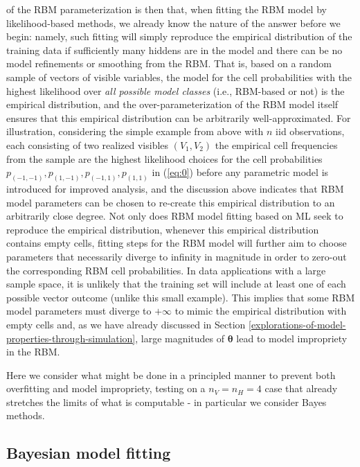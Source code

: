 \documentclass[12pt]{article}
\theoremstyle{definition}
\newcommand{\nv}{{n_{\scriptscriptstyle V}}}
\newcommand{\nh}{{n_{\scriptscriptstyle H}}}
\begin{document}
of the RBM parameterization is then that, when fitting the RBM model by
likelihood-based methods, we already know the nature of the answer
before we begin: namely, such fitting will simply reproduce the
empirical distribution of the training data if sufficiently many hiddens
are in the model and there can be no model refinements or smoothing from
the RBM. That is, based on a random sample of vectors of visible
variables, the model for the cell probabilities with the highest
likelihood over \emph{all possible model classes} (i.e., RBM-based or
not) is the empirical distribution, and the over-parameterization of the
RBM model itself ensures that this empirical distribution can be
arbitrarily well-approximated. For illustration, considering the simple
example from above with \(n\) iid observations, each consisting of two
realized visibles \((V_1,V_2)\) the empirical cell frequencies from the
sample are the highest likelihood choices for the cell probabilities
\(p_{(-1,-1)},p_{(1,-1)}, p_{(-1,1)},p_{(1,1)}\) in (\eqref{eq:0}) before
any parametric model is introduced for improved analysis, and the
discussion above indicates that RBM model parameters can be chosen to
re-create this empirical distribution to an arbitrarily close degree.
Not only does RBM model fitting based on ML seek to reproduce the
empirical distribution, whenever this empirical distribution contains
empty cells, fitting steps for the RBM model will further aim to choose
parameters that necessarily diverge to infinity in magnitude in order to
zero-out the corresponding RBM cell probabilities. In data applications
with a large sample space, it is unlikely that the training set will
include at least one of each possible vector outcome (unlike this small
example). This implies that some RBM model parameters must diverge to
\(+\infty\) to mimic the empirical distribution with empty cells and, as
we have already discussed in Section
\ref{explorations-of-model-properties-through-simulation}, large
magnitudes of \(\boldsymbol \theta\) lead to model impropriety in the
RBM.

Here we consider what might be done in a principled manner to prevent
both overfitting and model impropriety, testing on a \(\nv = \nh = 4\)
case that already stretches the limits of what is computable - in
particular we consider Bayes methods.

\subsection{Bayesian model fitting}\label{bayesian-model-fitting}
\end{document}
